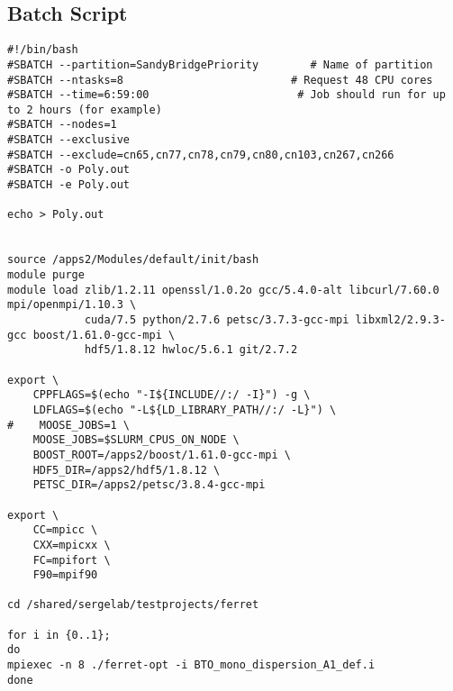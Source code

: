 \documentclass[a4paper]{article}
\begin{document}
\subsection{Batch Script}
\begin{verbatim}
#!/bin/bash
#SBATCH --partition=SandyBridgePriority        # Name of partition
#SBATCH --ntasks=8                          # Request 48 CPU cores
#SBATCH --time=6:59:00                       # Job should run for up to 2 hours (for example)
#SBATCH --nodes=1
#SBATCH --exclusive
#SBATCH --exclude=cn65,cn77,cn78,cn79,cn80,cn103,cn267,cn266
#SBATCH -o Poly.out
#SBATCH -e Poly.out

echo > Poly.out


source /apps2/Modules/default/init/bash
module purge
module load zlib/1.2.11 openssl/1.0.2o gcc/5.4.0-alt libcurl/7.60.0 mpi/openmpi/1.10.3 \
            cuda/7.5 python/2.7.6 petsc/3.7.3-gcc-mpi libxml2/2.9.3-gcc boost/1.61.0-gcc-mpi \
            hdf5/1.8.12 hwloc/5.6.1 git/2.7.2

export \
    CPPFLAGS=$(echo "-I${INCLUDE//:/ -I}") -g \
    LDFLAGS=$(echo "-L${LD_LIBRARY_PATH//:/ -L}") \
#    MOOSE_JOBS=1 \                                                                                                                                             
    MOOSE_JOBS=$SLURM_CPUS_ON_NODE \
    BOOST_ROOT=/apps2/boost/1.61.0-gcc-mpi \
    HDF5_DIR=/apps2/hdf5/1.8.12 \
    PETSC_DIR=/apps2/petsc/3.8.4-gcc-mpi

export \
    CC=mpicc \
    CXX=mpicxx \
    FC=mpifort \
    F90=mpif90

cd /shared/sergelab/testprojects/ferret

for i in {0..1};
do
mpiexec -n 8 ./ferret-opt -i BTO_mono_dispersion_A1_def.i
done

\end{verbatim}
\end{document}
